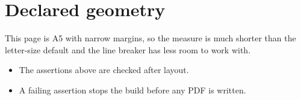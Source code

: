 \documentclass{article}
\begin{document}
\section{Declared geometry}

This page is A5 with narrow margins, so the measure is much shorter than the
letter-size default and the line breaker has less room to work with.

\begin{itemize}
  \item The assertions above are checked after layout.
  \item A failing assertion stops the build before any PDF is written.
\end{itemize}
\end{document}
